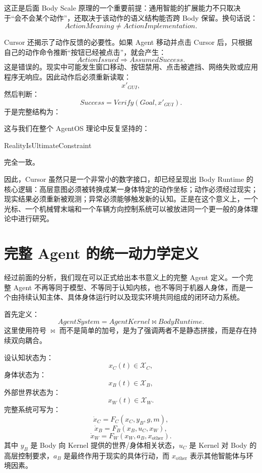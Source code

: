 这正是后面 Body Scale 原理的一个重要前提：通用智能的扩展能力不只取决于“会不会某个动作”，还取决于该动作的语义结构能否跨 Body 保留。换句话说：
\[
\boxed{
ActionMeaning
\neq
ActionImplementation.
}
\]

Cursor 还揭示了动作反馈的必要性。如果 Agent 移动并点击 Cursor 后，只根据自己的动作命令推断“按钮已经被点击”，就会产生：
\[
ActionIssued
\Rightarrow
AssumedSuccess.
\]
这是错误的。现实中可能发生窗口移动、按钮禁用、点击被遮挡、网络失败或应用程序无响应。因此动作后必须重新读取：
\[
x'_{GUI},
\]
然后判断：
\[
Success
=
Verify(
Goal,
x'_{GUI}
).
\]
于是完整结构为：
\begin{statementbox}
\centering
{}
\end{statementbox}

这与我们在整个 AgentOS 理论中反复坚持的：
\begin{statementbox}
RealityIsUltimateConstraint
\end{statementbox}
完全一致。

因此，Cursor 虽然只是一个非常小的数字接口，却已经呈现出 Body Runtime 的核心逻辑：高层意图必须被转换成某一身体特定的动作坐标；动作必须经过现实；现实结果必须重新被观测；异常必须能够触发新的认知。正是在这个意义上，一个光标、一个机械臂末端和一个车辆方向控制系统可以被放进同一个更一般的身体理论中进行研究。

\section{完整 Agent 的统一动力学定义}

经过前面的分析，我们现在可以正式给出本书意义上的完整 Agent 定义。一个完整 Agent 不再等同于模型、不等同于认知内核，也不等同于机器人身体，而是一个由持续认知主体、具体身体运行时以及现实环境共同组成的闭环动力系统。

首先定义：
\[
\boxed{
AgentSystem
=
AgentKernel
\bowtie
BodyRuntime.
}
\]
这里使用符号 $\bowtie$ 而不是简单的加号，是为了强调两者不是静态拼接，而是存在持续双向耦合。

设认知状态为：
\[
x_C(t)\in\mathcal X_C,
\]
身体状态为：
\[
x_B(t)\in\mathcal X_B,
\]
外部世界状态为：
\[
x_W(t)\in\mathcal X_W.
\]
完整系统可写为：
\[
\dot{x}_C
=
F_C
\left(
x_C,
y_B,
g,
m
\right),
\]
\[
\dot{x}_B
=
F_B
\left(
x_B,
u_C,
x_W
\right),
\]
\[
\dot{x}_W
=
F_W
\left(
x_W,
a_B,
x_{\mathrm{other}}
\right).
\]
其中 $y_B$ 是 Body 向 Kernel 提供的世界/身体相关状态，$u_C$ 是 Kernel 对 Body 的高层控制要求，$a_B$ 是最终作用于现实的具体行动，而 $x_{\mathrm{other}}$ 表示其他智能体与环境因素。

